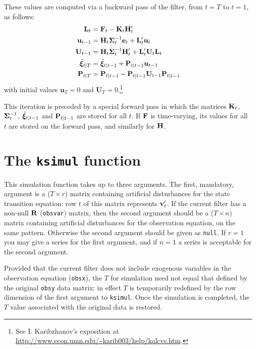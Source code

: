 These values are computed via a backward pass of the filter, from
$t = T$ to $t = 1$, as follows:
%
\begin{align*}
\mathbf{L}_t &= \mathbf{F}_t - \mathbf{K}_t \mathbf{H}_t' \\
\mathbf{u}_{t-1} &= \mathbf{H}_t \bm{\Sigma}_t^{-1} \mathbf{e}_t 
 + \mathbf{L}_t' \mathbf{u}_t \\
\mathbf{U}_{t-1} &= \mathbf{H}_t \bm{\Sigma}_t^{-1} \mathbf{H}_t' + 
  \mathbf{L}_t' \mathbf{U}_t \mathbf{L}_t \\
\hat{\bm{\xi}}_{t|T} &= \hat{\bm{\xi}}_{t|t-1} + 
  \mathbf{P}_{t|t-1} \mathbf{u}_{t-1} \\
\mathbf{P}_{t|T} &= \mathbf{P}_{t|t-1} - 
  \mathbf{P}_{t|t-1} \mathbf{U}_{t-1} \mathbf{P}_{t|t-1}
\end{align*}
%
with initial values $\mathbf{u}_T = 0$ and $\mathbf{U}_T =
0$.\footnote{See I. Karibzhanov's exposition at
\url{http://www.econ.umn.edu/~karib003/help/kalcvs.htm}.}

This iteration is preceded by a special forward pass in which the
matrices $\mathbf{K}_t$, $\bm{\Sigma}_t^{-1}$, $\hat{\bm{\xi}}_{t|t-1}$ and
$\mathbf{P}_{t|t-1}$ are stored for all $t$.  If $\mathbf{F}$
is time-varying, its values for all $t$ are stored on the forward
pass, and similarly for $\mathbf{H}$.


\section{The \texttt{ksimul} function}

This simulation function takes up to three arguments.  The first,
mandatory, argument is a ($T \times r$) matrix containing artificial
disturbances for the state transition equation: row $t$ of this matrix
represents $\mathbf{v}_t'$.  If the current filter has a non-null
$\mathbf{R}$ (\texttt{obsvar}) matrix, then the second argument should be
a ($T \times n$) matrix containing artificial disturbances for the
observation equation, on the same pattern.  Otherwise the second
argument should be given as \texttt{null}.  If $r=1$ you may give a
series for the first argument, and if $n=1$ a series is acceptable for
the second argument.

Provided that the current filter does not include exogenous variables
in the observation equation (\texttt{obsx}), the $T$ for simulation
need not equal that defined by the original \texttt{obsy} data matrix:
in effect $T$ is temporarily redefined by the row dimension of the
first argument to \texttt{ksimul}.  Once the simulation is completed,
the $T$ value associated with the original data is restored.

